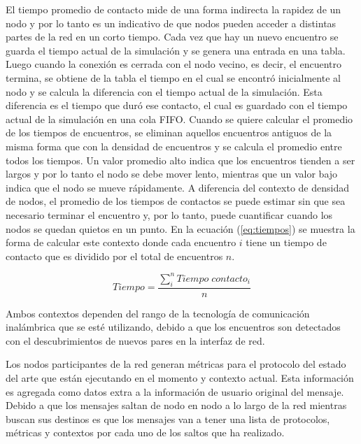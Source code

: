 El tiempo promedio de contacto mide de una forma indirecta la rapidez de un
nodo y por lo tanto es un indicativo de que nodos pueden acceder a distintas
partes de la red en un corto tiempo. Cada vez que hay un nuevo encuentro se
guarda el tiempo actual de la simulación y se genera una entrada en una tabla.
Luego cuando la conexión es cerrada con el nodo vecino, es decir, el encuentro
termina, se obtiene de la tabla el tiempo en el cual se encontró inicialmente al
nodo y se calcula la diferencia con el tiempo actual de la simulación. Esta
diferencia es el tiempo que duró ese contacto, el cual es guardado con el tiempo
actual de la simulación en una cola FIFO. Cuando se quiere calcular el promedio
de los tiempos de encuentros, se eliminan aquellos encuentros antiguos de la
misma forma que con la densidad de encuentros y se calcula el promedio entre
todos los tiempos. Un valor promedio alto indica que los encuentros tienden a
ser largos y por lo tanto el nodo se debe mover lento, mientras que un valor
bajo indica que el nodo se mueve rápidamente. A diferencia del contexto de
densidad de nodos, el promedio de los tiempos de contactos se puede estimar sin
que sea necesario terminar el encuentro y, por lo tanto, puede cuantificar
cuando los nodos se quedan quietos en un punto. En la ecuación (\ref{eq:tiempos})
se muestra la forma de calcular este contexto donde cada encuentro $i$ tiene un
tiempo de contacto que es dividido por el total de encuentros $n$.


\begin{equation}
  Tiempo = \frac{\sum^n_i Tiempo\;contacto_i}{n}
  \label{eq:tiempos}
\end{equation}


Ambos contextos dependen del rango de la tecnología de comunicación inalámbrica
que se esté utilizando, debido a que los encuentros son detectados con el
descubrimientos de nuevos pares en la interfaz de red.




Los nodos participantes de la red generan métricas para el protocolo del estado
del arte que están ejecutando en el momento y contexto actual. Esta información
es agregada como datos extra a la información de usuario original del mensaje.
Debido a que los mensajes saltan de nodo en nodo a lo largo de la red mientras
buscan sus destinos es que los mensajes van a tener una lista de protocolos,
métricas y contextos por cada uno de los saltos que ha realizado.




